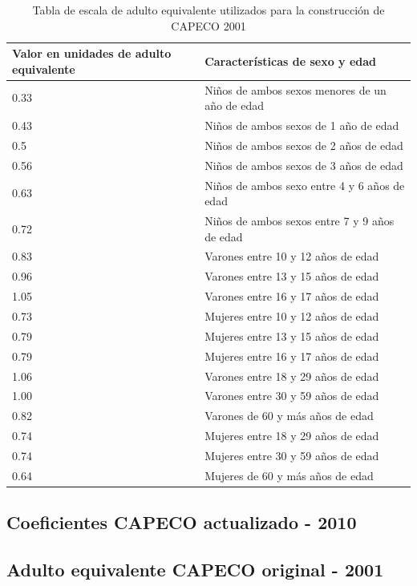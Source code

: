 \begin{table}[h!]
	\small
	\centering
	\label{tab:tableAE2001}
	\caption{Tabla de escala de adulto equivalente utilizados para la construcción de CAPECO 2001}
	\begin{tabular}{p{2cm}|p{6cm}}
		Valor en unidades de adulto equivalente & Características de sexo y edad \\
		\hline
		0.33&Niños de ambos sexos menores de un año de edad\\
		\hline		
		0.43&Niños de ambos sexos de 1 año de edad\\
		\hline		
		0.5&Niños de ambos sexos de 2 años de edad\\
		\hline		
		0.56&Niños de ambos sexos de 3 años de edad\\
		\hline		
		0.63&Niños de ambos sexo entre 4 y 6 años de edad\\
		\hline		
		0.72&Niños de ambos sexos entre 7 y 9 años de edad\\
		\hline		
		0.83&Varones entre 10 y 12 años de edad\\
		\hline		
		0.96&Varones entre 13 y 15 años de edad\\
		\hline		
		1.05&Varones entre 16 y 17 años de edad\\
		\hline		
		0.73&Mujeres entre 10 y 12 años de edad\\
		\hline		
		0.79&Mujeres entre 13 y 15 años de edad\\
		\hline		
		0.79&Mujeres entre 16 y 17 años de edad\\
		\hline		
		1.06&Varones entre 18 y 29 años de edad\\
		\hline		
		1.00&Varones entre 30 y 59 años de edad\\
		\hline		
		0.82&Varones de 60 y más años de edad\\
		\hline		
		0.74&Mujeres entre 18 y 29 años de edad\\
		\hline		
		0.74&Mujeres entre 30 y 59 años de edad\\
		\hline		
		0.64&Mujeres de 60 y más años de edad\\
	\end{tabular}
\end{table}


\subsection{Coeficientes CAPECO actualizado - 2010}

\subsection{Adulto equivalente CAPECO original - 2001}\label{anexo}


